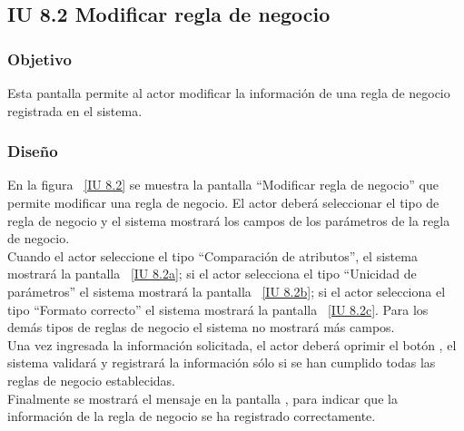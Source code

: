 \newpage 
\subsection{IU 8.2 Modificar regla de negocio}

\subsubsection{Objetivo}
	
	Esta pantalla permite al actor modificar la información de una regla de negocio registrada en el sistema.

\subsubsection{Diseño}

    En la figura ~\ref{IU 8.2} se muestra la pantalla ``Modificar regla de negocio'' que permite modificar una regla de negocio. El actor deberá 
    seleccionar el tipo de regla de negocio y el sistema mostrará los campos de los parámetros de la regla de negocio. \\
    
    Cuando el actor seleccione el tipo ``Comparación de atributos'', el sistema mostrará la pantalla ~\ref{IU 8.2a}; si el actor selecciona el tipo
    ``Unicidad de parámetros'' el sistema mostrará la pantalla ~\ref{IU 8.2b}; si el actor selecciona el tipo ``Formato correcto'' el sistema
    mostrará la pantalla ~\ref{IU 8.2c}. Para los demás tipos de reglas de negocio el sistema no mostrará más campos.\\
    
    Una vez ingresada la información solicitada, el actor deberá oprimir el botón , el sistema validará y registrará la información sólo si se han cumplido todas las reglas de negocio establecidas.  \\
    
    Finalmente se mostrará el mensaje  en la pantalla , 
    para indicar que la información de la regla de negocio
    se ha registrado correctamente.        



